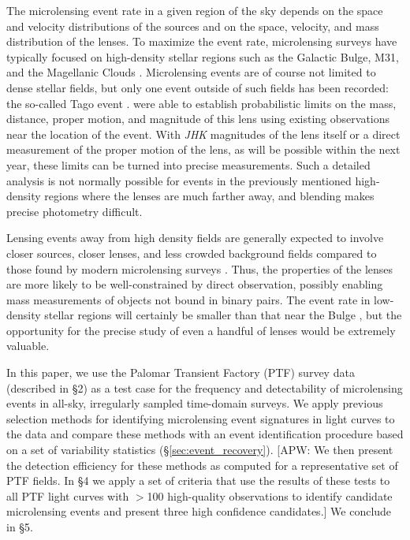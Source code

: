 \documentclass{emulateapj}
\begin{document}
The microlensing event rate in a given region of the sky depends on the space and velocity distributions of the sources and on the space, velocity, and mass distribution of the lenses. To maximize the event rate, microlensing surveys have typically focused on high-density stellar regions such as the Galactic Bulge, M31, and the Magellanic Clouds \citep[e.g.][]{original_ogle, original_macho, eros_original, crotts1996}. Microlensing events are of course not limited to dense stellar fields, but only one event outside of such fields has been recorded: the so-called Tago event \citep{fukui2007, gaudi2008}. \cite{gaudi2008} were able to establish probabilistic limits on the mass, distance, proper motion, and magnitude of this lens using existing observations near the location of the event. With \textit{JHK} magnitudes of the lens itself or a direct measurement of the proper motion of the lens, as will be possible within the next year, these limits can be turned into precise measurements. Such a detailed analysis is not normally possible for events in the previously mentioned high-density regions where the lenses are much farther away, and blending makes precise photometry difficult. 

Lensing events away from high density fields are generally expected to involve closer sources, closer lenses, and less crowded background fields compared to those found by modern microlensing surveys \citep{mesolensing}. Thus, the properties of the lenses are more likely to be well-constrained by direct observation, possibly enabling mass measurements of objects not bound in binary pairs. The event rate in low-density stellar regions will certainly be smaller than that near the Bulge \citep[e.g.,][]{wood_optical_depth, ogle_optical_depth, macho_optical_depth, eros_optical_depth}, but the opportunity for the precise study of even a handful of lenses would be extremely valuable. 

In this paper, we use the Palomar Transient Factory (PTF) survey data (described in \S2) as a test case for the frequency and detectability of microlensing events in all-sky, irregularly sampled time-domain surveys. We apply previous selection methods for identifying microlensing event signatures in light curves to the data and compare these methods with an event identification procedure based on a set of variability statistics (\S\ref{sec:event_recovery}). [APW: We then present the detection efficiency for these methods as computed for a representative set of PTF fields. In \S4 we apply a set of criteria that use the results of these tests to all PTF light curves with $>$100 high-quality observations to identify candidate microlensing events and present three high confidence candidates.] We conclude in \S5.
\end{document}
